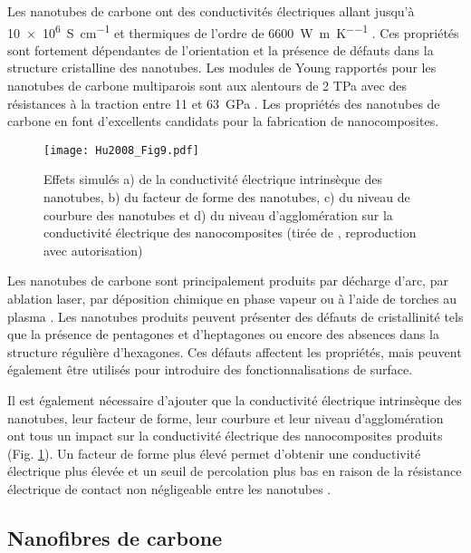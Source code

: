 Les nanotubes de carbone ont des conductivités électriques allant jusqu'à \SI[locale=FR]{10e6}{\siemens\per\centi\metre}  \cite{Sathyanarayana2013} et thermiques de l'ordre de \SI[locale=FR]{6600}{\watt\per\metre\per\kelvin} \cite{Berber2000}. 
Ces propriétés sont fortement dépendantes de l'orientation et la présence de défauts dans la structure cristalline des nanotubes. 
Les modules de Young rapportés pour les nanotubes de carbone multiparois sont aux alentours de 2 TPa avec des résistances à la traction entre 11 et \SI[locale=FR]{63}{\giga\pascal} \cite{Mittal2014h}. 
Les propriétés des nanotubes de carbone en font d'excellents candidats pour la fabrication de nanocomposites. 

\begin{figure}[htb]
	\centering
	\texttt{[image: Hu2008\_Fig9.pdf]}
	\caption{Effets simulés a) de la conductivité électrique intrinsèque des nanotubes, b) du facteur de forme des nanotubes, c) du niveau de courbure des nanotubes et d) du niveau d'agglomération sur la conductivité électrique des nanocomposites (tirée de \cite{Hu2008}, reproduction avec autorisation)}
	\label{fig:facteurs_geometriques_CNT}
\end{figure}

\FloatBarrier
Les nanotubes de carbone sont principalement produits par décharge d'arc, par ablation laser, par déposition chimique en phase vapeur \cite{Sathyanarayana2013} ou à l'aide de torches au plasma \cite{Kim2009e}. 
Les nanotubes produits peuvent présenter des défauts de cristallinité tels que la présence de pentagones et d'heptagones ou encore des absences dans la structure régulière d'hexagones. 
Ces défauts affectent les propriétés, mais peuvent également être utilisés pour introduire des fonctionnalisations de surface. 

Il est également nécessaire d'ajouter que la conductivité électrique intrinsèque des nanotubes, leur facteur de forme, leur courbure et leur niveau d'agglomération ont tous un impact sur la conductivité électrique des nanocomposites produits (Fig. \ref{fig:facteurs_geometriques_CNT}). 
Un facteur de forme plus élevé permet d'obtenir une conductivité électrique plus élevée et un seuil de percolation plus bas en raison de la résistance électrique de contact non négligeable entre les nanotubes \cite{Hu2008}. 

\subsection{Nanofibres de carbone}

